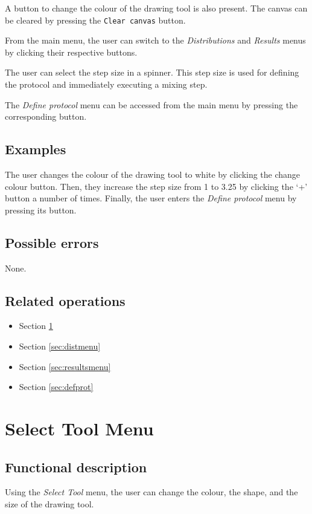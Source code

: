   A button to change the colour of the drawing tool is also present. The canvas can be cleared by pressing the \texttt{Clear canvas} button.
  
  From the main menu, the user can switch to the \emph{Distributions} and \emph{Results} menus by clicking their respective buttons.
  
  The user can select the step size in a spinner. This step size is used for defining the protocol and immediately executing a mixing step.
  
  The \emph{Define protocol} menu can be accessed from the main menu by pressing the corresponding button.
  
  \subsection*{Examples}
  The user changes the colour of the drawing tool to white by clicking the change colour button. Then, they increase the step size from 1 to 3.25 by clicking the `+' button a number of times. Finally, the user enters the \emph{Define protocol} menu by pressing its button.

  \subsection*{Possible errors}
  None.

  \subsection*{Related operations}
  \begin{itemize}
    \item Section \ref{sec:selecttoolmenu}
    \item Section \ref{sec:distmenu}
    \item Section \ref{sec:resultsmenu}
    \item Section \ref{sec:defprot}
  \end{itemize}

\section{Select Tool Menu}\label{sec:selecttoolmenu}
  \subsection*{Functional description}
  Using the \emph{Select Tool} menu, the user can change the colour, the shape, and the size of the drawing tool. 

